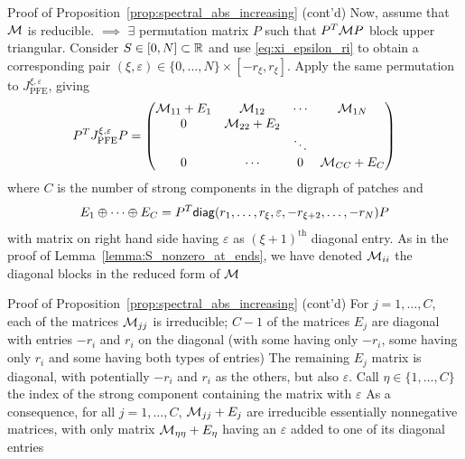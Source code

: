 \documentclass[aspectratio=169]{beamer}
\begin{document}
\begin{frame}{Proof of Proposition~\ref{prop:spectral_abs_increasing} (cont'd)}	
	Now, assume that $\mathcal{M}$ is reducible. $\implies$ $\exists$ permutation matrix $P$ such that $P^T\mathcal{M} P$ block upper triangular. Consider $S\in[0,N]\subset\mathbb{R}$ and use \eqref{eq:xi_epsilon_ri} to obtain a corresponding pair $(\xi,\varepsilon)\in\{0,\ldots,N\}\times [-r_{\xi},r_{\xi}]$. Apply the same permutation to $J_{\textrm{PFE}}^{\xi,\varepsilon}$, giving
	\[
	P^TJ_{\textrm{PFE}}^{\xi,\varepsilon}P
	=
	\begin{pmatrix}
	\mathcal{M}_{11}+E_1 & \mathcal{M}_{12} & \cdots & \mathcal{M}_{1N} \\
	0 & \mathcal{M}_{22}+E_2 & & \\
	&&\ddots & \\
	0 & \cdots & 0 & \mathcal{M}_{CC}+E_C
	\end{pmatrix}
	\]
	where $C$ is the number of strong components in the digraph of patches and
	\[
	E_1\oplus\cdots\oplus E_C = P^T\mathsf{diag}(r_1,\ldots,r_{\xi},\varepsilon,-r_{\xi+2},\ldots,-r_N)P
	\]
	with matrix on right hand side having $\varepsilon$ as $(\xi+1)^{\textrm{th}}$ diagonal entry.
	As in the proof of Lemma~\ref{lemma:S_nonzero_at_ends}, we have denoted $\mathcal{M}_{ii}$ the diagonal blocks in the reduced form of $\mathcal{M}$
\end{frame}

\begin{frame}{Proof of Proposition~\ref{prop:spectral_abs_increasing} (cont'd)}	
	For $j=1,\ldots,C$, each of the matrices $\mathcal{M}_{jj}$ is irreducible; $C-1$ of the matrices $E_j$ are diagonal with entries $-r_i$ and $r_i$ on the diagonal (with some having only $-r_i$, some having only $r_i$ and some having both types of entries)
	\vfill
	The remaining $E_j$ matrix is diagonal, with potentially $-r_i$ and $r_i$ as the others, but also $\varepsilon$. Call $\eta\in\{1,\ldots,C\}$ the index of the strong component containing the matrix with $\varepsilon$
	\vfill
	As a consequence, for all $j=1,\ldots,C$, $\mathcal{M}_{jj}+E_j$ are irreducible essentially nonnegative matrices, with only matrix $\mathcal{M}_{\eta\eta}+E_\eta$ having an $\varepsilon$ added to one of its diagonal entries
\end{frame}
\end{document}

